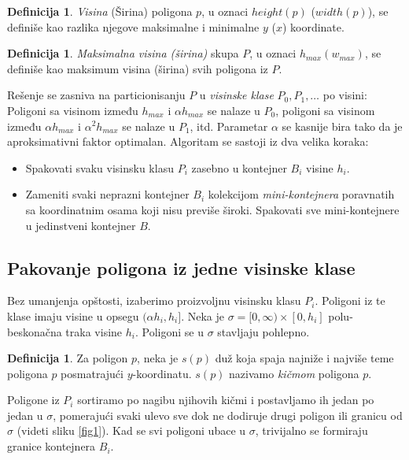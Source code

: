 \documentclass[a4paper]{article}
\theoremstyle{plain}
\theoremstyle{definition}
\newtheorem{defn}[thm]{Definicija}
\begin{document}
\begin{defn}
    \emph{Visina} (\v{Sirina}) poligona $p$, u oznaci \emph{$height(p)$} (\emph{$width(p)$}), se defini\v{s}e kao razlika njegove maksimalne i minimalne $y$ ($x$) koordinate.
\end{defn}

\begin{defn}
    \emph{Maksimalna visina (\v{s}irina)} skupa $P$, u oznaci \emph{$h_{max} (w_{max})$}, se defini\v{s}e kao maksimum visina (\v{s}irina) svih poligona iz $P$.
\end{defn}

Re\v{s}enje se zasniva na particionisanju $P$ u \emph{visinske klase} $P_{0}, P_{1}, \dots$ po visini: Poligoni sa visinom između $h_{max}$ i $\alpha h_{max}$ se nalaze u $P_{0}$, poligoni sa visinom između $\alpha h_{max}$ i $\alpha^{2} h_{max}$ se nalaze u $P_{1}$, itd. Parametar $\alpha$ se kasnije bira tako da je aproksimativni faktor optimalan. Algoritam se sastoji iz dva velika koraka:
\begin{itemize}
    \item Spakovati svaku visinsku klasu $P_{i}$ zasebno u kontejner $B_{i}$ visine $h_{i}$.
    \item Zameniti svaki neprazni kontejner $B_{i}$ kolekcijom \emph{mini-kontejnera} poravnatih sa koordinatnim osama koji nisu previ\v{s}e \v{s}iroki. Spakovati sve mini-kontejnere u jedinstveni kontejner $B$.
\end{itemize}


\subsection{Pakovanje poligona iz jedne visinske klase}
\label{subsec:Korak1}

Bez umanjenja op\v{s}tosti, izaberimo proizvoljnu visinsku klasu $P_{i}$. Poligoni iz te klase imaju visine u opsegu $(\alpha h_{i}, h_{i}]$. Neka je $\sigma = [0, \infty) \times [0, h_{i}]$ polu-beskona\v{c}na traka visine $h_{i}$. Poligoni se u $\sigma$ stavljaju pohlepno.

\begin{defn}
    Za poligon $p$, neka je $s(p)$ du\v{z} koja spaja najni\v{z}e i najvi\v{s}e teme poligona $p$ posmatraju\'c{}i $y$-koordinatu. $s(p)$ nazivamo \emph{ki\v{c}mom} poligona $p$.
\end{defn}

Poligone iz $P_{i}$ sortiramo po nagibu njihovih ki\v{c}mi i postavljamo ih jedan po jedan u $\sigma$, pomeraju\'c{}i svaki ulevo sve dok ne dodiruje drugi poligon ili granicu od $\sigma$ (videti sliku \ref{fig1}). Kad se svi poligoni ubace u $\sigma$, trivijalno se formiraju granice kontejnera $B_{i}$.
\end{document}
